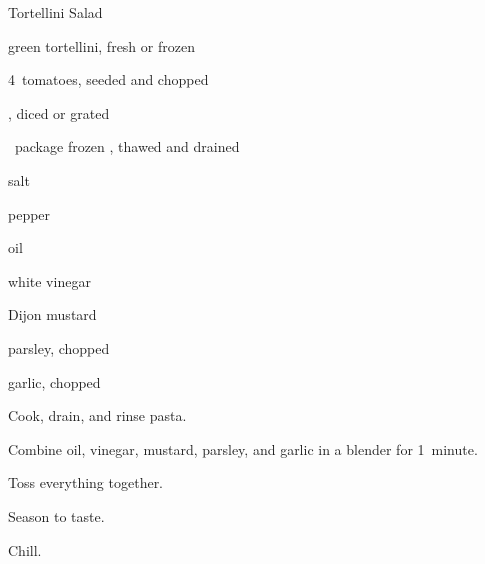\begin{recipe}{Tortellini Salad}{}{}

\begin{ingredients}
\item {} green tortellini, fresh or frozen
\item 4~tomatoes, seeded and chopped
\item \lbs{\half} , diced or grated
\item \half~package frozen , thawed and drained
\item \tp{\half} salt
\item pepper
\item {} oil
\item \C{\half} white vinegar
\item {} Dijon mustard
\item {} parsley, chopped
\item \Tp{\half} garlic, chopped
\end{ingredients}

\begin{directions}
\item Cook, drain, and rinse pasta.
\item Combine oil, vinegar, mustard, parsley, and garlic in a blender for 1~minute.
\item Toss everything together.
\item Season to taste.
\item Chill.
\end{directions}

\end{recipe}
